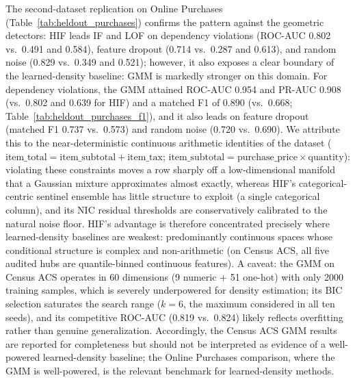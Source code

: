 \documentclass[pdflatex,sn-mathphys-num]{sn-jnl}
\theoremstyle{thmstyleone}%
\theoremstyle{thmstyletwo}%
\theoremstyle{thmstylethree}%
\begin{document}
The second-dataset replication on Online Purchases (Table~\ref{tab:heldout_purchases}) confirms the pattern against the geometric detectors: HIF leads IF and LOF on dependency violations (ROC-AUC 0.802 vs.\ 0.491 and 0.584), feature dropout (0.714 vs.\ 0.287 and 0.613), and random noise (0.829 vs.\ 0.349 and 0.521); however, it also exposes a clear boundary of the learned-density baseline: GMM is markedly stronger on this domain. For dependency violations, the GMM attained ROC-AUC 0.954 and PR-AUC 0.908 (vs.\ 0.802 and 0.639 for HIF) and a matched F1 of 0.890 (vs.\ 0.668; Table~\ref{tab:heldout_purchases_f1}), and it also leads on feature dropout (matched F1 0.737 vs.\ 0.573) and random noise (0.720 vs.\ 0.690). We attribute this to the near-deterministic continuous arithmetic identities of the dataset ($\text{item\_total} = \text{item\_subtotal} + \text{item\_tax}$; $\text{item\_subtotal} = \text{purchase\_price} \times \text{quantity}$): violating these constraints moves a row sharply off a low-dimensional manifold that a Gaussian mixture approximates almost exactly, whereas HIF's categorical-centric sentinel ensemble has little structure to exploit (a single categorical column), and its NIC residual thresholds are conservatively calibrated to the natural noise floor. HIF's advantage is therefore concentrated precisely where learned-density baselines are weakest: predominantly continuous spaces whose conditional structure is complex and non-arithmetic (on Census ACS, all five audited hubs are quantile-binned continuous features). A caveat: the GMM on Census ACS operates in 60 dimensions (9 numeric + 51 one-hot) with only 2000 training samples, which is severely underpowered for density estimation; its BIC selection saturates the search range ($k = 6$, the maximum considered in all ten seeds), and its competitive ROC-AUC (0.819 vs.\ 0.824) likely reflects overfitting rather than genuine generalization. Accordingly, the Census ACS GMM results are reported for completeness but should not be interpreted as evidence of a well-powered learned-density baseline; the Online Purchases comparison, where the GMM is well-powered, is the relevant benchmark for learned-density methods.
\end{document}
